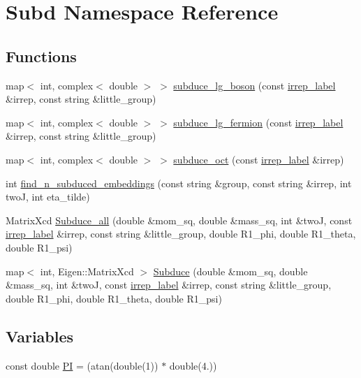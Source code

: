 \hypertarget{namespaceSubd}{}\section{Subd Namespace Reference}
\label{namespaceSubd}
\subsection*{Functions}
\begin{DoxyCompactItemize}
\item 
map$<$ int, complex$<$ double $>$ $>$ \mbox{\hyperlink{namespaceSubd_a5f31b3ef70ad25320a8010ec3017eb04}{subduce\+\_\+lg\+\_\+boson}} (const \mbox{\hyperlink{structirrep__label}{irrep\+\_\+label}} \&irrep, const string \&little\+\_\+group)
\item 
map$<$ int, complex$<$ double $>$ $>$ \mbox{\hyperlink{namespaceSubd_ae7ed68270fb8f7b5f574db245b085586}{subduce\+\_\+lg\+\_\+fermion}} (const \mbox{\hyperlink{structirrep__label}{irrep\+\_\+label}} \&irrep, const string \&little\+\_\+group)
\item 
map$<$ int, complex$<$ double $>$ $>$ \mbox{\hyperlink{namespaceSubd_aa8b77162377de658856d44a4ac5aad26}{subduce\+\_\+oct}} (const \mbox{\hyperlink{structirrep__label}{irrep\+\_\+label}} \&irrep)
\item 
int \mbox{\hyperlink{namespaceSubd_a7a3fcd97f1cf40eb963e278240d0ff3e}{find\+\_\+n\+\_\+subduced\+\_\+embeddings}} (const string \&group, const string \&irrep, int twoJ, int eta\+\_\+tilde)
\item 
Matrix\+Xcd \mbox{\hyperlink{namespaceSubd_a8712bb4f2b8dfa69f03cc781b7d48e85}{Subduce\+\_\+all}} (double \&mom\+\_\+sq, double \&mass\+\_\+sq, int \&twoJ, const \mbox{\hyperlink{structirrep__label}{irrep\+\_\+label}} \&irrep, const string \&little\+\_\+group, double R1\+\_\+phi, double R1\+\_\+theta, double R1\+\_\+psi)
\item 
map$<$ int, Eigen\+::\+Matrix\+Xcd $>$ \mbox{\hyperlink{namespaceSubd_a16b9b11dade3168c5507f7cf509b1a2e}{Subduce}} (double \&mom\+\_\+sq, double \&mass\+\_\+sq, int \&twoJ, const \mbox{\hyperlink{structirrep__label}{irrep\+\_\+label}} \&irrep, const string \&little\+\_\+group, double R1\+\_\+phi, double R1\+\_\+theta, double R1\+\_\+psi)
\end{DoxyCompactItemize}
\subsection*{Variables}
\begin{DoxyCompactItemize}
\item 
const double \mbox{\hyperlink{namespaceSubd_ace729813ef603fd0775fe11788d9ad07}{PI}} = (atan(double(1)) $\ast$ double(4.))
\end{DoxyCompactItemize}


